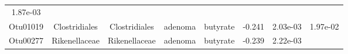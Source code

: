 \documentclass[11pt,]{article}
\begin{document}
\begin{longtable}[]{@{}cccccccc@{}}
\begin{minipage}[t]{0.08\columnwidth}
1.87e-03\strut
\end{minipage}\tabularnewline
\begin{minipage}[t]{0.08\columnwidth}\centering\strut
Otu01019\strut
\end{minipage} & \begin{minipage}[t]{0.15\columnwidth}\centering\strut
Clostridiales\strut
\end{minipage} & \begin{minipage}[t]{0.15\columnwidth}\centering\strut
Clostridiales\strut
\end{minipage} & \begin{minipage}[t]{0.08\columnwidth}\centering\strut
adenoma\strut
\end{minipage} & \begin{minipage}[t]{0.09\columnwidth}\centering\strut
butyrate\strut
\end{minipage} & \begin{minipage}[t]{0.07\columnwidth}\centering\strut
-0.241\strut
\end{minipage} & \begin{minipage}[t]{0.08\columnwidth}\centering\strut
2.03e-03\strut
\end{minipage} & \begin{minipage}[t]{0.08\columnwidth}\centering\strut
1.97e-02\strut
\end{minipage}\tabularnewline
\begin{minipage}[t]{0.08\columnwidth}\centering\strut
Otu00277\strut
\end{minipage} & \begin{minipage}[t]{0.15\columnwidth}\centering\strut
Rikenellaceae\strut
\end{minipage} & \begin{minipage}[t]{0.15\columnwidth}\centering\strut
Rikenellaceae\strut
\end{minipage} & \begin{minipage}[t]{0.08\columnwidth}\centering\strut
adenoma\strut
\end{minipage} & \begin{minipage}[t]{0.09\columnwidth}\centering\strut
butyrate\strut
\end{minipage} & \begin{minipage}[t]{0.07\columnwidth}\centering\strut
-0.239\strut
\end{minipage} & \begin{minipage}[t]{0.08\columnwidth}\centering\strut
2.22e-03\strut
\end{minipage} & \begin{minipage}[t]{0.08\columnwidth}\centering\strut

\end{minipage}
\end{longtable}
\end{document}
